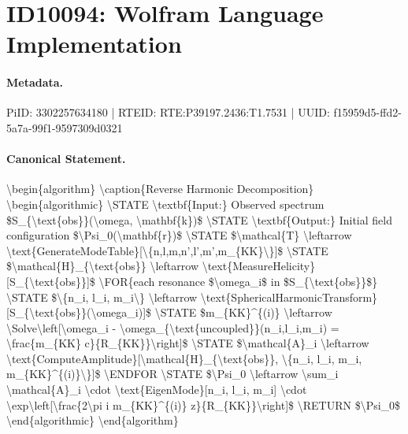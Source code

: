 \section*{ID10094: Wolfram Language Implementation}
\paragraph{Metadata.}
PiID: 3302257634180 | RTEID: RTE:P39197.2436:T1.7531 | UUID: f15959d5-ffd2-5a7a-99f1-9597309d0321

\paragraph{Canonical Statement.}
\textbackslash{}begin\{algorithm\} \textbackslash{}caption\{Reverse Harmonic Decomposition\} \textbackslash{}begin\{algorithmic\} \textbackslash{}STATE \textbackslash{}textbf\{Input:\} Observed spectrum \$S\_\{\textbackslash{}text\{obs\}\}(\textbackslash{}omega, \textbackslash{}mathbf\{k\})\$ \textbackslash{}STATE \textbackslash{}textbf\{Output:\} Initial field configuration \$\textbackslash{}Psi\_0(\textbackslash{}mathbf\{r\})\$ \textbackslash{}STATE \$\textbackslash{}mathcal\{T\} \textbackslash{}leftarrow \textbackslash{}text\{GenerateModeTable\}[\textbackslash{}\{n,l,m,n',l',m',m\_\{KK\}\textbackslash{}\}]\$ \textbackslash{}STATE \$\textbackslash{}mathcal\{H\}\_\{\textbackslash{}text\{obs\}\} \textbackslash{}leftarrow \textbackslash{}text\{MeasureHelicity\}[S\_\{\textbackslash{}text\{obs\}\}]\$ \textbackslash{}FOR\{each resonance \$\textbackslash{}omega\_i\$ in \$S\_\{\textbackslash{}text\{obs\}\}\$\} \textbackslash{}STATE \$\textbackslash{}\{n\_i, l\_i, m\_i\textbackslash{}\} \textbackslash{}leftarrow \textbackslash{}text\{SphericalHarmonicTransform\}[S\_\{\textbackslash{}text\{obs\}\}(\textbackslash{}omega\_i)]\$ \textbackslash{}STATE \$m\_\{KK\}\textasciicircum{}\{(i)\} \textbackslash{}leftarrow \textbackslash{}Solve\textbackslash{}left[\textbackslash{}omega\_i - \textbackslash{}omega\_\{\textbackslash{}text\{uncoupled\}\}(n\_i,l\_i,m\_i) = \textbackslash{}frac\{m\_\{KK\} c\}\{R\_\{KK\}\}\textbackslash{}right]\$ \textbackslash{}STATE \$\textbackslash{}mathcal\{A\}\_i \textbackslash{}leftarrow \textbackslash{}text\{ComputeAmplitude\}[\textbackslash{}mathcal\{H\}\_\{\textbackslash{}text\{obs\}\}, \textbackslash{}\{n\_i, l\_i, m\_i, m\_\{KK\}\textasciicircum{}\{(i)\}\textbackslash{}\}]\$ \textbackslash{}ENDFOR \textbackslash{}STATE \$\textbackslash{}Psi\_0 \textbackslash{}leftarrow \textbackslash{}sum\_i \textbackslash{}mathcal\{A\}\_i \textbackslash{}cdot \textbackslash{}text\{EigenMode\}[n\_i, l\_i, m\_i] \textbackslash{}cdot \textbackslash{}exp\textbackslash{}left[\textbackslash{}frac\{2\textbackslash{}pi i m\_\{KK\}\textasciicircum{}\{(i)\} z\}\{R\_\{KK\}\}\textbackslash{}right]\$ \textbackslash{}RETURN \$\textbackslash{}Psi\_0\$ \textbackslash{}end\{algorithmic\} \textbackslash{}end\{algorithm\}

